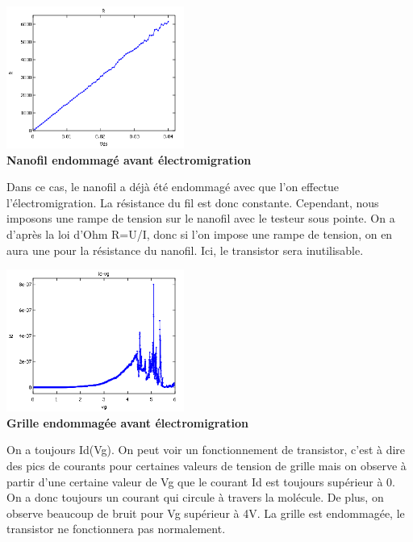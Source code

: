 \begin{center}
    \includegraphics[width=220px]{Images/4_Nanofil_Emdommage.png}\\
    \textbf{Nanofil endommagé avant électromigration}
\end{center}
Dans ce cas, le nanofil a déjà été endommagé avec que l'on effectue l'électromigration. La résistance du fil est donc constante. Cependant, nous imposons une rampe de tension sur le nanofil avec le testeur sous pointe. On a d'après la loi d'Ohm R=U/I, donc si l'on impose une rampe de tension, on en aura une pour la résistance du nanofil. Ici, le transistor sera inutilisable.\medskip 


\begin{center}
    \includegraphics[width=220px]{Images/4_Grille_Endommagee.png}\\
    \textbf{Grille endommagée avant électromigration}
\end{center}
On a toujours Id(Vg). On peut voir un fonctionnement de transistor, c'est à dire des pics de courants pour certaines valeurs de tension de grille mais on observe à partir d'une certaine valeur de Vg que le courant Id est toujours supérieur à 0. On a donc toujours un courant qui circule à travers la molécule. De plus, on observe beaucoup de bruit pour Vg supérieur à 4V. La grille est endommagée, le transistor ne fonctionnera pas normalement.\medskip 

